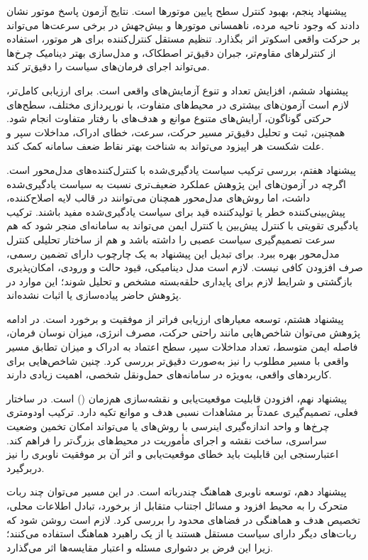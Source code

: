 پیشنهاد پنجم، بهبود کنترل سطح پایین موتورها است. نتایج آزمون پاسخ موتور نشان دادند که وجود ناحیه مرده، ناهمسانی موتورها و بیش‌جهش در برخی سرعت‌ها می‌تواند بر حرکت واقعی اسکوتر اثر بگذارد. تنظیم مستقل کنترل‌کننده برای هر موتور، استفاده از کنترلرهای مقاوم‌تر، جبران دقیق‌تر اصطکاک، و مدل‌سازی بهتر دینامیک چرخ‌ها می‌تواند اجرای فرمان‌های سیاست را دقیق‌تر کند.

پیشنهاد ششم، افزایش تعداد و تنوع آزمایش‌های واقعی است. برای ارزیابی کامل‌تر، لازم است آزمون‌های بیشتری در محیط‌های متفاوت، با نورپردازی مختلف، سطح‌های حرکتی گوناگون، آرایش‌های متنوع موانع و هدف‌های با رفتار متفاوت انجام شود. همچنین، ثبت و تحلیل دقیق‌تر مسیر حرکت، سرعت، خطای ادراک، مداخلات سپر و علت شکست هر اپیزود می‌تواند به شناخت بهتر نقاط ضعف سامانه کمک کند.

پیشنهاد هفتم، بررسی ترکیب سیاست یادگیری‌شده با کنترل‌کننده‌های مدل‌محور است. اگرچه  در آزمون‌های این پژوهش عملکرد ضعیف‌تری نسبت به سیاست یادگیری‌شده داشت، اما روش‌های مدل‌محور همچنان می‌توانند در قالب لایه اصلاح‌کننده، پیش‌بینی‌کننده خطر یا تولیدکننده قید برای سیاست یادگیری‌شده مفید باشند. ترکیب یادگیری تقویتی با کنترل پیش‌بین یا کنترل ایمن می‌تواند به سامانه‌ای منجر شود که هم سرعت تصمیم‌گیری سیاست عصبی را داشته باشد و هم از ساختار تحلیلی کنترل مدل‌محور بهره ببرد.
برای تبدیل این پیشنهاد به یک چارچوب دارای تضمین رسمی، صرف افزودن  کافی نیست. لازم است مدل دینامیکی، قیود حالت و ورودی، امکان‌پذیری بازگشتی و شرایط لازم برای پایداری حلقه‌بسته مشخص و تحلیل شوند؛ این موارد در پژوهش حاضر پیاده‌سازی یا اثبات نشده‌اند.


پیشنهاد هشتم، توسعه معیارهای ارزیابی فراتر از موفقیت و برخورد است. در ادامه پژوهش می‌توان شاخص‌هایی مانند راحتی حرکت، مصرف انرژی، میزان نوسان فرمان، فاصله ایمن متوسط، تعداد مداخلات سپر، سطح اعتماد به ادراک و میزان تطابق مسیر واقعی با مسیر مطلوب را نیز به‌صورت دقیق‌تر بررسی کرد. چنین شاخص‌هایی برای کاربردهای واقعی، به‌ویژه در سامانه‌های حمل‌ونقل شخصی، اهمیت زیادی دارند.

پیشنهاد نهم، افزودن قابلیت موقعیت‌یابی و نقشه‌سازی هم‌زمان () است. در ساختار فعلی، تصمیم‌گیری عمدتاً بر مشاهدات نسبی هدف و موانع تکیه دارد. ترکیب اودومتری چرخ‌ها و واحد اندازه‌گیری اینرسی با روش‌های  یا  می‌تواند امکان تخمین وضعیت سراسری، ساخت نقشه و اجرای مأموریت در محیط‌های بزرگ‌تر را فراهم کند. اعتبارسنجی این قابلیت باید خطای موقعیت‌یابی و اثر آن بر موفقیت ناوبری را نیز دربرگیرد.

پیشنهاد دهم، توسعه ناوبری هماهنگ چندرباته است. در این مسیر می‌توان چند ربات متحرک را به محیط افزود و مسائل اجتناب متقابل از برخورد، تبادل اطلاعات محلی، تخصیص هدف و هماهنگی در فضاهای محدود را بررسی کرد. لازم است روشن شود که ربات‌های دیگر دارای سیاست مستقل هستند یا از یک راهبرد هماهنگ استفاده می‌کنند؛ زیرا این فرض بر دشواری مسئله و اعتبار مقایسه‌ها اثر می‌گذارد.

